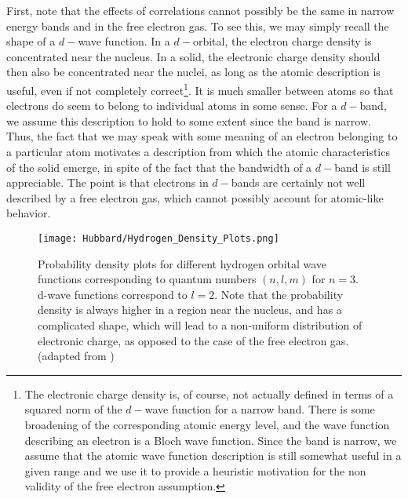 First, note that the effects of correlations cannot possibly be the same in narrow energy bands and in the free electron gas.
To see this, we may simply recall the shape of a $d-$wave function.
In a $d-$orbital, the electron charge density is concentrated near the nucleus.
In a solid, the electronic charge density should then also be concentrated near the nuclei, as long as the atomic description is useful, even if not completely correct\footnote{The electronic charge density is, of course, not actually defined in terms of a squared norm of the $d-$wave function for a narrow band. There is some broadening of the corresponding atomic energy level, and the wave function describing an electron is a Bloch wave function. Since the band is narrow, we assume that the atomic wave function description is still somewhat useful in a given range and we use it to provide a heuristic motivation for the non validity of the free electron assumption.}.
It is much smaller between atoms so that electrons do seem to belong to individual atoms in some sense.
For a $d-$band, we assume this description to hold to some extent since the band is narrow.
Thus, the fact that we may speak with some meaning of an electron belonging to a particular atom motivates a description from which the atomic characteristics of the solid emerge, in spite of the fact that the bandwidth of a $d-$band is still appreciable.
The point is that electrons in $d-$bands are certainly not well described by a free electron gas, which cannot possibly account for atomic-like behavior.

\begin{figure}[H]\label{fig:hydrogenWF}
\centering
\texttt{[image: Hubbard/Hydrogen\_Density\_Plots.png]}
\caption[Hydrogen atomic wave functions.]{Probability density plots for different hydrogen orbital wave functions corresponding to quantum numbers $(n, l, m)$ for $n = 3$.
d-wave functions correspond to $l=2$. Note that the probability density is always higher in a region near the nucleus, and has a complicated shape, which will lead to a non-uniform distribution of electronic charge, as opposed to the case of the free electron gas. (adapted from \cite{hydrogen})}
\end{figure}

